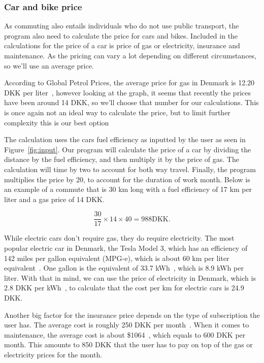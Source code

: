\subsubsection{Car and bike price}

As commuting also entails individuals who do not use public transport, the program also need to calculate the price for
cars and bikes.
Included in the calculations for the price of a car is price of gas or electricity, insurance and maintenance.
As the pricing can vary a lot depending on different circumstances, so we'll use an average price.

According to Global Petrol Prices, the average price for gas in Denmark is 12.20 DKK per liter~\cite{price_gas}, however
looking at the graph, it seems that recently the prices have been around 14 DKK, so we'll choose that number for our
calculations.
This is once again not an ideal way to calculate the price, but to limit further complexity this is our best option

The calculation uses the cars fuel efficiency as inputted by the user as seen in Figure~\ref{fig:input}.
Our program will calculate the price of a car by dividing the distance by the fuel efficiency, and then multiply it by
the price of gas.
The calculation will time by two to account for both way travel.
Finally, the program multiplies the price by 20, to account for the duration of work month.
Below is an example of a commute that is 30 km long with a fuel efficiency of 17 km per liter and a gas price of 14 DKK.

\begin{equation}
    \frac{30}{17} \times 14 \times 40 = 988 \text{DKK}.\label{eq:equation}
\end{equation}

While electric cars don't require gas, they do require electricity.
The most popular electric car in Denmark, the Tesla Model 3, which has an efficiency of 142 miles per gallon equivalent
(MPG-e), which is about 60 km per liter equivalent~\cite{price_el}.
One gallon is the equivalent of 33.7 kWh~\cite{price_mpge}, which is 8.9 kWh per liter.
With that in mind, we can use the price of electricity in Denmark, which is 2.8 DKK per kWh~\cite{price_energy}, to
calculate that the cost per km for electric cars is 24.9 DKK.

Another big factor for the insurance price depends on the type of subscription the user has.
The average cost is roughly 250 DKK per month~\cite{price_insurance}.
When it comes to maintenance, the average cost is about \$1064~\cite{price_repair}, which equals to 600 DKK per month.
This amounts to 850 DKK that the user has to pay on top of the gas or electricity prices for the month.

